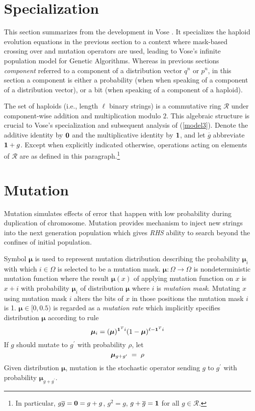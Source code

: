 \section{Specialization}\label{specialize}
This section summarizes from the development in Vose \cite{Vose1999}.
It specializes the haploid evolution equations in the previous section 
to a context where mask-based crossing over and mutation operators are used, 
leading to Vose's infinite population model for Genetic Algorithms.  Whereas 
in previous sections {\em component} referred to a component
of a distribution vector $q^n$ or $p^n$, in this section a component
is either a probability (when when speaking of a component of a
distribution vector), or a bit (when speaking of a component of a
haploid).

The set of haploids (i.e., length $\ell$ binary strings) is a
commutative ring $\mathcal{R}$ under component-wise addition and
multiplication modulo $2$.  This algebraic structure is crucial to
Vose's specialization and subsequent analysis of
(\ref{model3}). Denote the additive identity by ${\bf 0}$ and the
multiplicative identity by ${\bf 1}$, and let $\overline{g}$
abbreviate ${\bf 1} + g$.  Except when explicitly indicated otherwise,
operations acting on elements of $\mathcal{R}$ are as defined in this
paragraph.\footnote{In particular, $g \overline{g} = {\bf 0} = g+g$,
  $g^2 = g$, $g + \overline{g} = {\bf 1}$ for all $g \in
  \mathcal{R}$.}

\section{Mutation}
Mutation simulates effects of error that happen with low probability during duplication of chromosome. 
Mutation provides mechanism to inject new strings into the next generation population which gives {\em RHS} 
ability to search beyond the confines of initial population.

Symbol $\bm{\mu}$ is used to represent mutation distribution describing the probability $\bm{\mu}_i$ with which 
$i \in \Omega$ is selected to be a mutation mask. $\bm{\mu} : \Omega \rightarrow \Omega$ is nondeterministic mutation 
function where the result $\bm{\mu}(x)$ of applying mutation function on $x$ is $x + i$ with probability 
$\bm{\mu}_i$ of distribution $\bm{\mu}$ where $i$ is {\em mutation mask}. Mutating $x$ using mutation mask $i$ 
alters the bits of $x$ in those positions the mutation mask $i$ is 1.
$\bm{\mu} \in [0, 0.5)$ is regarded as a {\em mutation rate} which implicitly specifies distribution $\bm{\mu}$ 
according to rule \cite{VoseWright1998}
\[
\bm{\mu}_i = (\bm{\mu})^{{\bf 1}^Ti} (1-\bm{\mu})^{\ell- {\bf 1}^Ti}
\]
If $g$ should mutate to $g^\prime$ with probability $\rho$,
let\\[-0.2in]
\[
\bm{\mu}_{g + g^\prime} \; = \; \rho\\[0.05in]
\]
Given distribution $\bm{\mu}$, mutation is the stochastic operator sending
$g$ to $g^\prime$ with probability $\bm{\mu}_{g + g^\prime}$.

